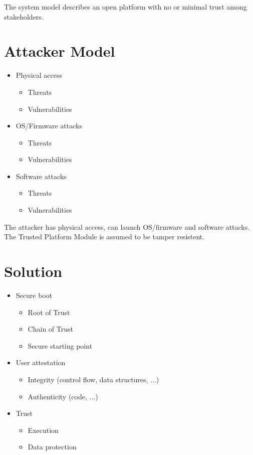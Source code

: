 \documentclass{report}
\begin{document}
The system model describes an open platform with no or minimal trust among stakeholders.

\section{Attacker Model}

\begin{itemize}
\item Physical access \begin{itemize}
\item Threats
\item Vulnerabilities
\end{itemize}
\item OS/Firmware attacks \begin{itemize}
\item Threats
\item Vulnerabilities
\end{itemize}
\item Software attacks \begin{itemize}
\item Threats
\item Vulnerabilities
\end{itemize}
\end{itemize}

The attacker has physical access, can launch OS/firmware and software attacks. The Trusted Platform Module is assumed to be tamper resistent.

\section{Solution}

\begin{itemize}
\item Secure boot \begin{itemize}
\item Root of Trust
\item Chain of Trust
\item Secure starting point
\end{itemize}
\item User attestation \begin{itemize}
\item Integrity (control flow, data structures, ...)
\item Authenticity (code, ...)
\end{itemize}
\item Trust \begin{itemize}
\item Execution
\item Data protection
\end{itemize}
\end{itemize}
\end{document}
